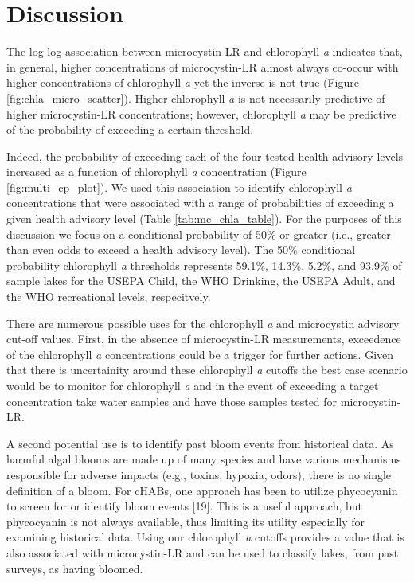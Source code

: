 \documentclass[11pt,]{article}
\begin{document}
\section{Discussion}\label{discussion}

The log-log association between microcystin-LR and chlorophyll \emph{a}
indicates that, in general, higher concentrations of microcystin-LR
almost always co-occur with higher concentrations of chlorophyll
\emph{a} yet the inverse is not true (Figure
\ref{fig:chla_micro_scatter}). Higher chlorophyll \emph{a} is not
necessarily predictive of higher microcystin-LR concentrations; however,
chlorophyll \emph{a} may be predictive of the probability of exceeding a
certain threshold.

Indeed, the probability of exceeding each of the four tested health
advisory levels increased as a function of chlorophyll \emph{a}
concentration (Figure \ref{fig:multi_cp_plot}). We used this association
to identify chlorophyll \emph{a} concentrations that were associated
with a range of probabilities of exceeding a given health advisory level
(Table \ref{tab:mc_chla_table}). For the purposes of this discussion we
focus on a conditional probability of 50\% or greater (i.e., greater
than even odds to exceed a health advisory level). The 50\% conditional
probability chlorophyll \emph{a} thresholds represents 59.1\%, 14.3\%,
5.2\%, and 93.9\% of sample lakes for the USEPA Child, the WHO Drinking,
the USEPA Adult, and the WHO recreational levels, respecitvely.

There are numerous possible uses for the chlorophyll \emph{a} and
microcystin advisory cut-off values. First, in the absence of
microcystin-LR measurements, exceedence of the chlorophyll \emph{a}
concentrations could be a trigger for further actions. Given that there
is uncertainity around these chlorophyll \emph{a} cutoffs the best case
scenario would be to monitor for chlorophyll \emph{a} and in the event
of exceeding a target concentration take water samples and have those
samples tested for microcystin-LR.

A second potential use is to identify past bloom events from historical
data. As harmful algal blooms are made up of many species and have
various mechanisms responsible for adverse impacts (e.g., toxins,
hypoxia, odors), there is no single definition of a bloom. For cHABs,
one approach has been to utilize phycocyanin to screen for or identify
bloom events {[}19{]}. This is a useful approach, but phycocyanin is not
always available, thus limiting its utility especially for examining
historical data. Using our chlorophyll \emph{a} cutoffs provides a value
that is also associated with microcystin-LR and can be used to classify
lakes, from past surveys, as having bloomed.
\end{document}

